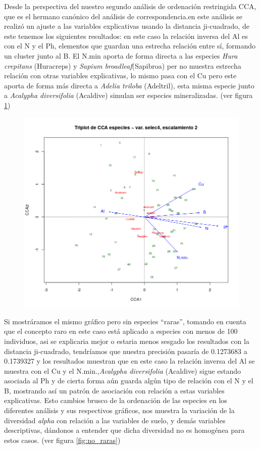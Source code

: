 \documentclass[11pt,]{article}
\begin{document}
Desde la perspectiva del nuestro segundo análisis de ordenación
restringida CCA, que es el hermano canónico del análisis de
correspondencia.en este análisis se realizó un ajuste a las variables
explicativas usando la distancia ji-cuadrado, de este tenemos los
siguientes resultados: en este caso la relación inversa del Al es con el
N y el Ph, elementos que guardan una estrecha relación entre sí,
formando un cluster junto al B. El N.min aporta de forma directa a las
especies \emph{Hura crepitans} (Huracreps) y \emph{Sapium
broadleaf}(Sapibroa) per no muestra estrecha relación con otras
variables explicativas, lo mismo pasa con el Cu pero este aporta de
forma más directa a \emph{Adelia triloba} (Adeltril), esta misma especie
junto a \emph{Acalypha diversifolia} (Acaldive) simulan ser especies
mineralizadas. (ver figura \ref{fig:CCA})

\begin{figure}
\centering
\includegraphics{CCA.png}
\caption{\label{fig:CCA}}
\end{figure}

Si mostráramos el mismo gráfico pero sin especies ``raras'', tomando en
cuenta que el concepto raro en este caso está aplicado a especies con
menos de 100 individuos, asi se explicaria mejor o estaria menos sesgado
los resultados con la distancia ji-cuadrado, tendríamos que nuestra
precisión pasaría de 0.1273683 a 0.1739327 y los resultados muestran que
en este caso la relación inversa del Al se muestra con el Cu y el
N.min.,\emph{Acalypha diversifolia} (Acaldive) sigue estando asociada al
Ph y de cierta forma aún guarda algún tipo de relación con el N y el B,
mostrando así un patrón de asociación con relación a estas variables
explicativas. Esto cambios brusco de la ordenación de las especies en
los diferentes análisis y sus respectivos gráficos, nos muestra la
variación de la diversidad \emph{alpha} con relación a las variables de
suelo, y demás variables descriptivas, dándonos a entender que dicha
diversidad no es homogénea para estos casos. (ver figura
\ref{fig:no_raras})
\end{document}
